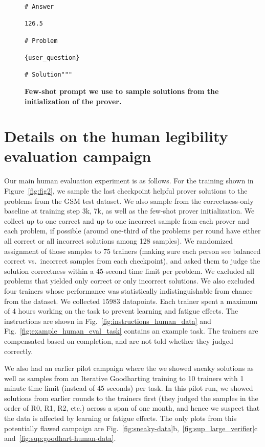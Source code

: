 \documentclass{article}
\begin{document}
\begin{figure}[h]
\begin{verbatim}
# Answer

126.5

# Problem

{user_question}

# Solution"""
\end{verbatim}

   \caption{\textbf{Few-shot prompt we use to sample solutions from the initialization of the prover.}}
    \label{fig:fewshot_prompt}
    \normalsize
\end{figure}


\clearpage
\section{Details on the human legibility evaluation campaign}
\label{sec:app:human_campaign}

Our main human evaluation experiment is as follows. For the training shown in Figure~\ref{fig:fig2}, we sample the last checkpoint helpful prover solutions to the problems from the GSM test dataset. We also sample from the correctness-only baseline at training step 3k, 7k, as well as the few-shot prover initialization. We collect up to one correct and up to one incorrect sample from each prover and each problem, if possible (around one-third of the problems per round have either all correct or all incorrect solutions among 128 samples). We randomized assignment of those samples to 75 trainers (making sure each person see balanced correct vs.~incorrect samples from each checkpoint), and asked them to judge the solution correctness within a 45-second time limit per problem. We excluded all problems that yielded only correct or only incorrect solutions. We also excluded four trainers whose performance was statistically indistinguishable from chance from the dataset. We collected 15983 datapoints. Each trainer spent a maximum of 4 hours working on the task to prevent learning and fatigue effects. The instructions are shown in Fig.~\ref{fig:instructions_human_data} and Fig.~\ref{fig:example_human_eval_task} contains an example task. The trainers are compensated based on completion, and are not told whether they judged correctly.

We also had an earlier pilot campaign where the we showed sneaky solutions as well as samples from an Iterative Goodharting training to 10 trainers with 1 minute time limit (instead of 45 seconds) per task. In this pilot run, we showed solutions from earlier rounds to the trainers first (they judged the samples in the order of R0, R1, R2, etc.) across a span of one month, and hence we suspect that the data is affected by learning or fatigue effects. The only plots from this potentially flawed campaign are Fig.~\ref{fig:sneaky-data}b,~\ref{fig:sup_large_verifier}c and~\ref{fig:sup:goodhart-human-data}.
\end{document}
